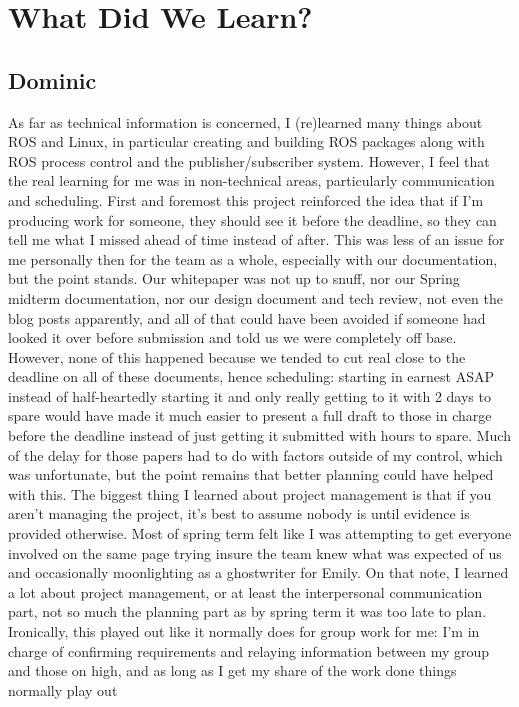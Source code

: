 \documentclass[IEEEtran,letterpaper,10pt,notitlepage,draftclsnofoot,onecolumn]{article}
\begin{document}
\section{What Did We Learn?}
\subsection{Dominic}
As far as technical information is concerned, I (re)learned many
things about ROS and Linux, in particular creating and building
ROS packages along with ROS process control and the publisher/subscriber
system. However, I feel that the real learning for me was in
non-technical areas, particularly communication and scheduling. First
and foremost this project reinforced the idea that if I’m producing
work for someone, they should see it before the deadline, so they
can tell me what I missed ahead of time instead of after. This was less
of an issue for me personally then for the team as a whole, especially
with our documentation, but the point stands. Our whitepaper was not
up to snuff, nor our Spring midterm documentation, nor our design document
and tech review, not even the blog posts apparently, and all of that could
have been avoided if someone had looked it over before submission and told
us we were completely off base. However, none of this happened because we
tended to cut real close to the deadline on all of these documents, hence
scheduling: starting in earnest ASAP instead of half-heartedly starting it
and only really getting to it with 2 days to spare would have made it much
easier to present a full draft to those in charge before the deadline instead
of just getting it submitted with hours to spare. Much of the delay for those
papers had to do with factors outside of my control, which was unfortunate, but
the point remains that better planning could have helped with this. The biggest
thing I learned about project management is that if you aren’t managing the
project, it’s best to assume nobody is until evidence is provided otherwise.
Most of spring term felt like I was attempting to get everyone involved on the
same page trying insure the team knew what was expected of us and occasionally
moonlighting as a ghostwriter for Emily. On that note, I learned a lot about
project management, or at least the interpersonal communication part, not so
much the planning part as by spring term it was too late to plan. Ironically,
this played out like it normally does for group work for me: I’m in charge of
confirming requirements and relaying information between my group and those on
high, and as long as I get my share of the work done things normally play out
\end{document}
